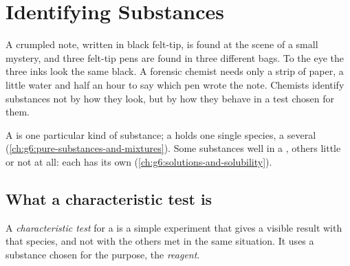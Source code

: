 \chapter{Identifying Substances}\label{ch:g7:identifying-substances}

A crumpled note, written in black felt-tip, is found at the scene of a
small mystery, and three felt-tip pens are found in three different
bags. To the eye the three inks look the same black. A forensic chemist
needs only a strip of paper, a little water and half an hour to say
which pen wrote the note. Chemists identify substances not by how they
look, but by how they behave in a test chosen for them.

\begin{recall}
A  is one particular kind of substance; a 
holds one single species, a  several
(\cref{ch:g6:pure-substances-and-mixtures}). Some substances 
well in a , others little or not at all: each has its own
 (\cref{ch:g6:solutions-and-solubility}).
\end{recall}

\section{What a characteristic test is}

\begin{definition}\label{def:g7:identifying-substances:characteristic-test}
A \emph{characteristic test} for a  is a simple experiment that gives a visible result with that
species, and not with the others met in the same situation. It uses a
substance chosen for the purpose, the
\emph{reagent}.
\end{definition}


